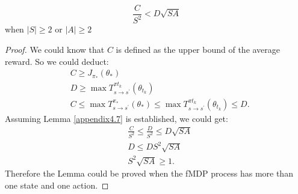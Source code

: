 \begin{lemma}
\label{appendix4.7}

$$\frac{C}{S^{2}} < D\sqrt{SA}$$ when $|S| \geq 2$ or $|A| \geq 2$

\begin{proof}
We could know that $C$ is defined as the upper bound of the average reward. So we could deduct:
\begin{equation}
\begin{aligned}
&C \geq J_{\pi_{*}}\left(\theta_{*}\right)\\
&D \geq \max T_{s \rightarrow s^{\prime}}^{\pi t_{k}}\left(\theta_{t_{k}}\right)\\
&C \leq \max T_{s \rightarrow s^{\prime}}^{\pi_{*}}\left(\theta_{*}\right) \leq \max T_{s \rightarrow s^{\prime}}^{\pi t_{k}}\left(\theta_{t_{k}}\right) \leq D.
\end{aligned}
\end{equation}
Assuming Lemma \ref{appendix4.7} is established, we could get:
\begin{equation}
\begin{aligned}
&\frac{C}{S^{2}} \leq \frac{D}{S^{2}} \leq D\sqrt{SA}\\
&D \leq DS^{2}\sqrt{SA}\\
&S^{2}\sqrt{SA} \geq 1.
\end{aligned}
\end{equation}
Therefore the Lemma could be proved when the fMDP process has more than one state and one action. 
\end{proof}
\end{lemma}

